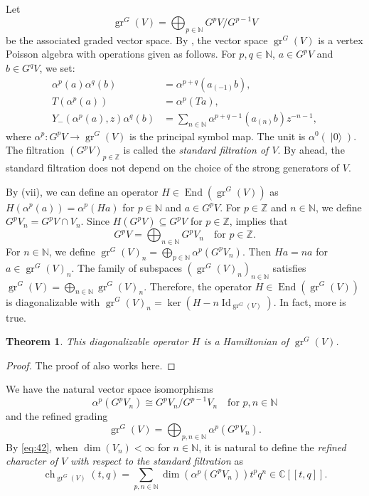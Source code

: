 \documentclass[a4paper, 12pt, reqno]{amsart}
\newtheorem{theorem}{Theorem}[section]
\theoremstyle{remark}
\DeclareMathOperator{\Id}{Id}
\DeclareMathOperator{\gr}{gr}
\DeclareMathOperator{\End}{End}
\DeclareMathOperator{\ch}{ch}
\DeclareMathOperator{\vac}{|0\rangle}
\begin{document}
Let
\begin{equation*}
  \gr^G(V) = \bigoplus_{p \in \mathbb{N}}G^pV/G^{p - 1}V
\end{equation*}
be the associated graded vector space.
By \cite{li_vertex_2004}, the vector space $\gr^G(V)$ is a vertex Poisson algebra with operations given as follows.
For $p, q \in \mathbb{N}$, $a \in G^pV$ and $b \in G^qV$, we set:
\begin{align*}
  \alpha^p(a)\alpha^q(b) &= \alpha^{p + q}(a_{(-1)}b), \\
  T(\alpha^p(a)) &= \alpha^p(Ta), \\
  Y_-(\alpha^p(a), z)\alpha^q(b) &= \sum_{n \in \mathbb{N}}\alpha^{p + q - 1}(a_{(n)}b)z^{-n - 1},
\end{align*}
where $\alpha^p: G^pV \to \gr^G(V)$ is the principal symbol map.
The unit is $\alpha^0(\vac)$.
The filtration $(G^pV)_{p \in \mathbb{Z}}$ is called the \emph{standard filtration of $V$}.
By  ahead, the standard filtration does not depend on the choice of the strong generators of $V$.

By (vii), we can define an operator $H \in \End(\gr^G(V))$ as $H(\alpha^p(a)) = \alpha^p(Ha)$ for $p \in \mathbb{N}$ and $a \in G^pV$.
For $p \in \mathbb{Z}$ and $n \in \mathbb{N}$, we define $G^pV_n = G^pV \cap V_n$.
Since $H(G^pV) \subseteq G^pV$ for $p \in \mathbb{Z}$,  implies that
\begin{equation*}
  G^pV = \bigoplus_{n \in \mathbb{N}}G^pV_n \quad \text{for $p \in \mathbb{Z}$}.
\end{equation*}
For $n \in \mathbb{N}$, we define $\gr^G(V)_n = \bigoplus_{p \in \mathbb{N}}\alpha^p(G^pV_n)$.
Then $Ha = na$ for $a \in \gr^G(V)_n$.
The family of subspaces $(\gr^G(V)_n)_{n \in \mathbb{N}}$ satisfies $\gr^G(V) = \bigoplus_{n \in \mathbb{N}}\gr^G(V)_n$.
Therefore, the operator $H \in \End(\gr^G(V))$ is diagonalizable with $\gr^G(V)_n = \ker(H - n\Id_{\gr^G(V)})$.
In fact, more is true.

\begin{theorem}
  \label{thr:52}
  This diagonalizable operator $H$ is a Hamiltonian of $\gr^G(V)$.
\end{theorem}

\begin{proof}
  The proof of  also works here.
\end{proof}

We have the natural vector space isomorphisms
\begin{equation*}
  \alpha^p(G^pV_n) \cong G^pV_n/G^{p - 1}V_n \quad \text{for $p, n \in \mathbb{N}$}
\end{equation*}
and the refined grading
\begin{equation}
  \label{eq:42}
  \gr^G(V) = \bigoplus_{p, n \in \mathbb{N}}\alpha^p(G^pV_n).
\end{equation}
By \eqref{eq:42}, when $\dim(V_n) < \infty$ for $n \in \mathbb{N}$, it is natural to define the \emph{refined character of $V$ with respect to the standard filtration} as
\begin{equation*}
  \ch_{\gr^G(V)}(t, q) = \sum_{p, n \in \mathbb{N}}\dim(\alpha^p(G^pV_n))t^pq^n \in \mathbb{C}[[t, q]].
\end{equation*}
\end{document}

